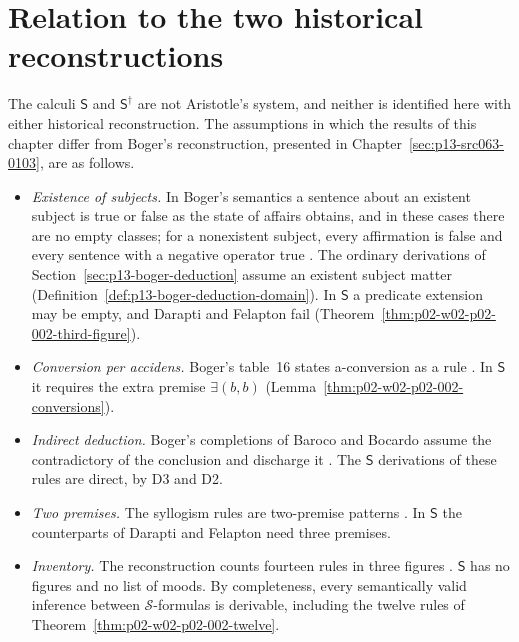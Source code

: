 \section{Relation to the two historical reconstructions}
\label{sec:p02-w02-p02-002-historical}

The calculi \(\mathsf S\) and \(\mathsf S^\dagger\) are not Aristotle's
system, and neither is identified here with either historical
reconstruction. The assumptions in which the results of this chapter
differ from Boger's reconstruction, presented in
Chapter~\ref{sec:p13-src063-0103}, are as follows.
\begin{itemize}
\item \emph{Existence of subjects.} In Boger's semantics a sentence about an
 existent subject is true or false as the state of affairs obtains, and in
 these cases there are no empty classes; for a nonexistent subject, every
 affirmation is false and every sentence with a negative operator true
 \cite[p.~159]{Boger2004UnderlyingLogic}. The ordinary derivations of
 Section~\ref{sec:p13-boger-deduction} assume an existent subject matter
 (Definition~\ref{def:p13-boger-deduction-domain}). In \(\mathsf S\) a
 predicate extension may be empty, and Darapti and Felapton fail
 (Theorem~\ref{thm:p02-w02-p02-002-third-figure}).
\item \emph{Conversion per accidens.} Boger's table~16 states
 a-conversion as a rule \cite[p.~183]{Boger2004UnderlyingLogic}. In
 \(\mathsf S\) it requires the extra premise \(\exists(b,b)\)
 (Lemma~\ref{thm:p02-w02-p02-002-conversions}).
\item \emph{Indirect deduction.} Boger's completions of Baroco and Bocardo
 assume the contradictory of the conclusion and discharge it
 \cite[p.~187, table~19]{Boger2004UnderlyingLogic}. The \(\mathsf S\)
 derivations of these rules are direct, by D3 and D2.
\item \emph{Two premises.} The syllogism rules are two-premise patterns
 \cite[p.~166]{Boger2004UnderlyingLogic}. In \(\mathsf S\) the
 counterparts of Darapti and Felapton need three premises.
\item \emph{Inventory.} The reconstruction counts fourteen rules in three
 figures \cite[p.~184]{Boger2004UnderlyingLogic}. \(\mathsf S\) has no
 figures and no list of moods. By completeness, every semantically valid
 inference between \(\mathcal S\)-formulas is derivable, including the
 twelve rules of Theorem~\ref{thm:p02-w02-p02-002-twelve}.
\end{itemize}

